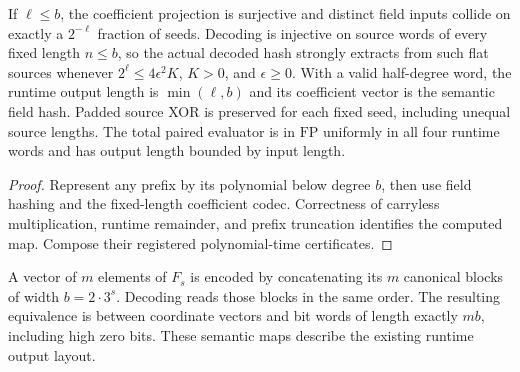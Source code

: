 \begin{theorem}
  \label{thm:lowerbounds-algebraic-binary-hashing}
  \leanok
  If $\ell\le b$, the coefficient projection is surjective and distinct
  field inputs collide on exactly a $2^{-\ell}$ fraction of seeds.
  Decoding is injective on source words of every fixed length $n\le b$,
  so the actual decoded hash strongly extracts from such flat sources
  whenever $2^\ell\le4\epsilon^2K$, $K>0$, and $\epsilon\ge0$.
  With a valid half-degree word, the runtime output length is
  $\min(\ell,b)$ and its coefficient vector is the semantic field hash.
  Padded source XOR is preserved for each fixed seed, including unequal
  source lengths. The total paired evaluator is in $\mathrm{FP}$ uniformly
  in all four runtime words and has output length bounded by input length.
\end{theorem}
\begin{proof}
  \leanok
  Represent any prefix by its polynomial below degree $b$, then use field
  hashing and the fixed-length coefficient codec. Correctness of carryless
  multiplication, runtime remainder, and prefix truncation identifies the
  computed map. Compose their registered polynomial-time certificates.
\end{proof}

\begin{definition}
  \label{def:lowerbounds-algebraic-condenser-serialization}
  \leanok
  A vector of $m$ elements of $F_s$ is encoded by concatenating its $m$
  canonical blocks of width $b=2\cdot3^s$. Decoding reads those blocks
  in the same order. The resulting equivalence is between coordinate
  vectors and bit words of length exactly $mb$, including high zero bits.
  These semantic maps describe the existing runtime output layout.
\end{definition}

